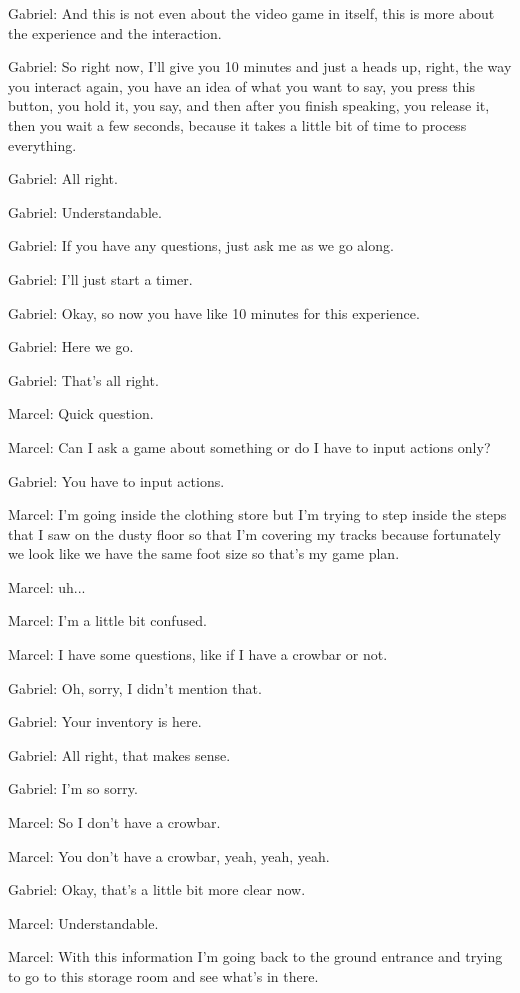 Gabriel: And this is not even about the video game in itself, this is more about the experience and the interaction.

Gabriel: So right now, I'll give you 10 minutes and just a heads up, right, the way you interact again, you have an idea of what you want to say, you press this button, you hold it, you say, and then after you finish speaking, you release it, then you wait a few seconds, because it takes a little bit of time to process everything.

Gabriel: All right.

Gabriel: Understandable.

Gabriel: If you have any questions, just ask me as we go along.

Gabriel: I'll just start a timer.

Gabriel: Okay, so now you have like 10 minutes for this experience.

Gabriel: Here we go.

Gabriel: That's all right.

Marcel: Quick question.

Marcel: Can I ask a game about something or do I have to input actions only?

Gabriel: You have to input actions.

Marcel: I'm going inside the clothing store but I'm trying to step inside the steps that I saw on the dusty floor so that I'm covering my tracks because fortunately we look like we have the same foot size so that's my game plan.

Marcel: uh...

Marcel: I'm a little bit confused.

Marcel: I have some questions, like if I have a crowbar or not.

Gabriel: Oh, sorry, I didn't mention that.

Gabriel: Your inventory is here.

Gabriel: All right, that makes sense.

Gabriel: I'm so sorry.

Marcel: So I don't have a crowbar.

Marcel: You don't have a crowbar, yeah, yeah, yeah.

Gabriel: Okay, that's a little bit more clear now.

Marcel: Understandable.

Marcel: With this information I'm going back to the ground entrance and trying to go to this storage room and see what's in there.

